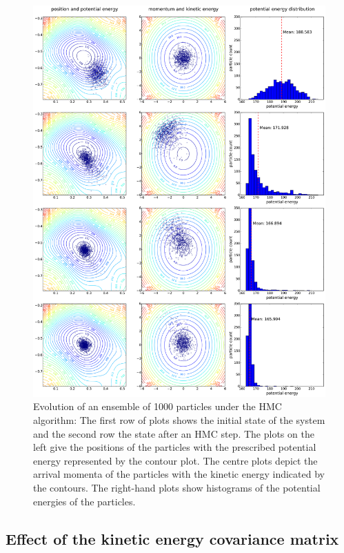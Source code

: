 \begin{figure}[t]
\centering
\includegraphics[width=2.05\columnwidth]{figures/hmcvi_distrib_example_top.pdf}
\caption{Evolution of an ensemble of 1000 particles under the HMC algorithm: The first row of plots shows the initial state of the system and the second row the state after an HMC step. The plots on the left give the positions of the particles with the prescribed potential energy represented by the contour plot. The centre plots depict the arrival momenta of the particles with the kinetic energy indicated by the contours. The right-hand plots show histograms of the potential energies of the particles.}
\label{fig:HMC_Effect_Illustration}
\end{figure}

\subsection{Effect of the kinetic energy covariance matrix}
\label{sec:EffectOfKineticEnergyChoice}

